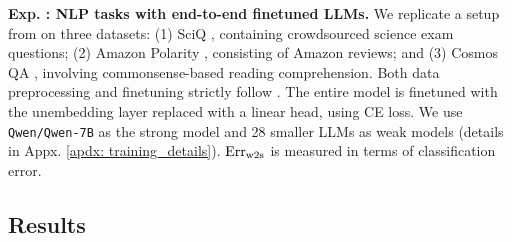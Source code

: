 

\textbf{Exp. : NLP tasks with end-to-end finetuned LLMs.} We replicate a setup from \cite{burns2023weak} on three datasets: (1) SciQ \cite{welbl2017crowdsourcing}, containing crowdsourced science exam questions; 
(2) Amazon Polarity \cite{zhang2015character}, consisting of Amazon reviews; and (3) Cosmos QA \cite{huang2019cosmos}, involving commonsense-based reading comprehension. Both data preprocessing and finetuning strictly follow \cite{burns2023weak}. The entire model is finetuned with the unembedding layer replaced with a linear head, using CE loss. We use \texttt{Qwen/Qwen-7B} \cite{bai2023qwen} as the strong model and 28 smaller LLMs as weak models (details in Appx. \ref{apdx: training_details}). $\text{Err}_{\text{w2s}}$ is measured in terms of classification error.
\vspace{-0cm}



\subsection{Results}

